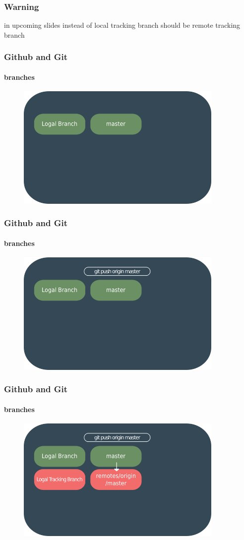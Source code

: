 \documentclass{beamer}
\begin{document}
	\begin{frame}
		\frametitle{Warning}
		in upcoming slides instead of local tracking branch should be remote tracking branch
	\end{frame}		
	
	\begin{frame}
		\frametitle{Github and Git}
		\framesubtitle{branches}
		\begin{figure}[htbp]
			\centering
			\includegraphics[width=10cm]{remotebranch1}
		\end{figure}
	\end{frame}
	
	\begin{frame}
		\frametitle{Github and Git}
		\framesubtitle{branches}
		\begin{figure}[htbp]
			\centering
			\includegraphics[width=10cm]{remotebranch2}
		\end{figure}
	\end{frame}
	
	\begin{frame}
		\frametitle{Github and Git}
		\framesubtitle{branches}
		\begin{figure}[htbp]
			\centering
			\includegraphics[width=10cm]{remotebranch3}
		\end{figure}
	\end{frame}
	
\end{document}

